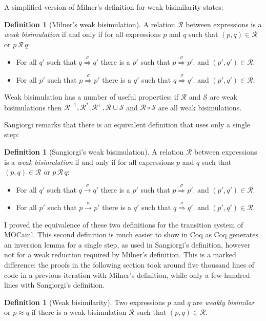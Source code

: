 \documentclass[12pt,twoside,notitlepage]{report}
\theoremstyle{plain}%
\theoremstyle{definition}
\newtheorem{defn}[thm]{Definition}
\theoremstyle{remark}
\begin{document}
A simplified version of Milner's definition for weak bisimilarity states:
\begin{defn}[Milner's weak bisimulation]
A relation $ \mathcal{R} $ between expressions is a \textit{weak bisimulation} if and only if for all expressions $ p $ and $ q $ such that $ (p,q)\in \mathcal{R} $ or $ p\, \mathcal{R}\, q $:
\begin{itemize}
\item{For all $ q' $ such that $ q \overset{\sigma}{\Rightarrow} q' $ there is a $ p' $ such that $ p \overset{\sigma}{\Rightarrow} p' $. and $ (p', q') \in \mathcal{R}$. }
\item{For all $ p' $ such that $ p \overset{\sigma}{\Rightarrow} p' $ there is a $ q' $ such that $ q \overset{\sigma}{\Rightarrow} q' $. and $ (p', q') \in \mathcal{R}$. }
\end{itemize}
\end{defn}

Weak bisimulation has a number of useful properties: if $ \mathcal{R} $ and $ \mathcal{S} $ are weak bisimulations then $ \mathcal{R}^{-1}, \mathcal{R}^*, \mathcal{R}^+, \mathcal{R}\cup\mathcal{S}$  and $\mathcal{R} \circ \mathcal{S} $ are all weak bisimulations.

Sangiorgi\cite{sangiorgi1992problem} remarks that there is an equivalent definition that uses only a single step:
\begin{defn}[Sangiorgi's weak bisimulation]
A relation $ \mathcal{R} $ between expressions is a \textit{weak bisimulation} if and only if for all expressions $ p $ and $ q $ such that $ (p,q)\in \mathcal{R} $ or $ p\, \mathcal{R}\, q $:
\begin{itemize}
\item{For all $ q' $ such that $ q \overset{\sigma}{\rightarrow} q' $ there is a $ p' $ such that $ p \overset{\sigma}{\Rightarrow} p' $. and $ (p', q') \in \mathcal{R}$. }
\item{For all $ p' $ such that $ p \overset{\sigma}{\rightarrow} p' $ there is a $ q' $ such that $ q \overset{\sigma}{\Rightarrow} q' $. and $ (p', q') \in \mathcal{R}$. }
\end{itemize}
\end{defn}

I proved the equivalence of these two definitions for the transition system of MOCaml. This second definition is much easier to show in Coq as Coq generates an inversion lemma for a single step, as used in Sangiorgi's definition, however not for a weak reduction required by Milner's definition. This is a marked difference: the proofs in the following section took around five thousand lines of code in a previous iteration with Milner's definition, while only a few hundred lines with Sangiorgi's definition.
\begin{defn}[Weak bisimilarity]
\label{defn:weak_bisimilarity}
Two expressions $ p $ and $ q $ are \textit{weakly bisimilar} or $ p\approx q $ if there is a weak bisimulation $ \mathcal{R} $ such that $ (p,q) \in \mathcal{R} $.
\end{defn}
\end{document}
